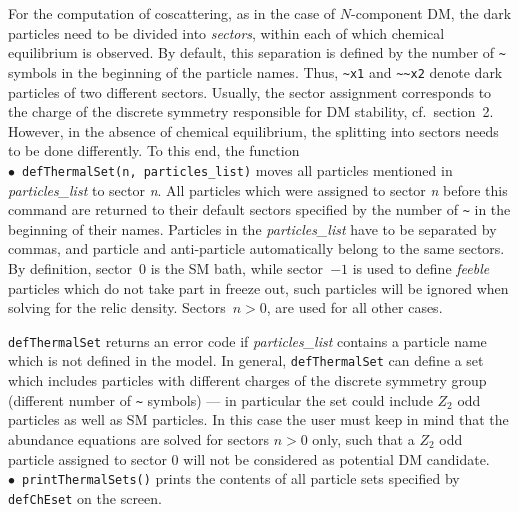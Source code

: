 \documentclass[12pt,a4paper]{article}
\begin{document}
For the computation of coscattering, as in the case of $N$-component DM, the dark particles 
need to be divided into \emph{sectors}, within each of which chemical equilibrium is %
observed.  
By default, this separation is defined by the number of \verb|~| symbols in the beginning of the 
particle names. Thus, \verb|~x1| and \verb|~~x2| denote dark particles of two different sectors. 
Usually, the sector assignment corresponds to the charge of the discrete symmetry responsible 
for DM stability, cf.\ section~2. 
However, in the absence of chemical equilibrium, the splitting into sectors needs to be done differently. 
To this end, the function
\\
$\bullet$~\verb|defThermalSet(n, particles_list)| 
moves all particles mentioned in {\it  particles\_list } to sector {\it n}. All
particles which were assigned to sector {\it n}  before this command are returned to their default sectors
specified by the number of  \verb|~| in the beginning of their names.
Particles in the {\it particles\_list} have to be separated by commas, and particle and anti-particle
automatically belong to the same sectors.  By definition, sector~$0$ is the SM bath, while 
sector~$-1$ is used to define {\it feeble} particles which do not take part in freeze out, such particles will be ignored when solving for the relic density. 
Sectors~$n>0$, are used for all other cases. 




\verb|defThermalSet| returns an error code if {\it particles\_list} contains a particle name which is not defined in the model. 
In general, \verb|defThermalSet| can define a set which includes particles with different charges of the 
discrete symmetry  group (different number of \verb|~| symbols) --- in particular the set could include $Z_2$ odd particles as well as 
 SM particles.  In this case the user must keep in mind that the abundance equations are solved for sectors $n>0$ only, such that a $Z_2$ odd particle assigned to sector 0 will not be considered as potential DM candidate.
\\
$\bullet$~\verb|printThermalSets()| prints the contents of all particle sets specified by \verb|defChEset| on the screen. 
\end{document}
